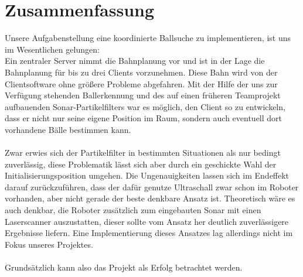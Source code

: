 
\chapter{Zusammenfassung}
\label{cha:zusammenfassung}
Unsere Aufgabenstellung eine koordinierte Ballsuche 
zu implementieren, ist uns im Wesentlichen gelungen:\\
Ein zentraler Server nimmt die Bahnplanung vor und ist in der Lage die
Bahnplanung für bis zu drei Clients vorzunehmen. Diese Bahn wird von
der Clientsoftware ohne größere Probleme abgefahren. Mit der Hilfe der
uns zur Verfügung stehenden Ballerkennung und des
auf einen früheren Teamprojekt aufbauenden Sonar-Partikelfilters war
es möglich, den Client so zu
entwickeln, dass er nicht nur seine eigene Position im Raum, sondern
auch eventuell dort vorhandene Bälle bestimmen kann. \\\\
Zwar erwies sich der Partikelfilter in bestimmten Situationen als nur
bedingt zuverlässig, diese Problematik lässt sich aber durch ein
geschickte Wahl der Initialisierungsposition umgehen. Die
Ungenauigkeiten lassen sich im Endeffekt darauf zurückzuführen, dass
der dafür genutze Ultraschall zwar schon im Roboter vorhanden, aber
nicht gerade der beste denkbare Ansatz ist. Theoretisch wäre
es auch denkbar, die Roboter zusätzlich zum eingebauten Sonar mit
einen Laserscanner auszustatten, dieser sollte vom Ansatz her deutlich
zuverlässigere Ergebnisse liefern. Eine Implementierung dieses
Ansatzes lag allerdings nicht im Fokus unseres Projektes. \\\\
Grundsätzlich kann also das Projekt als Erfolg betrachtet werden.
